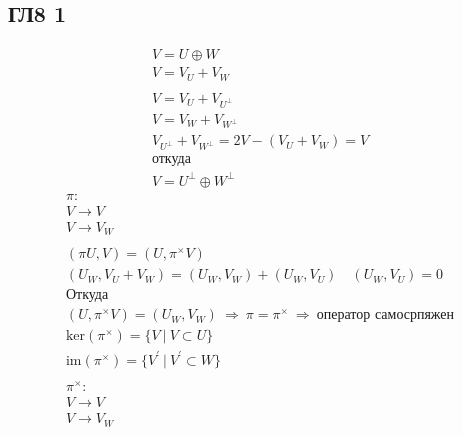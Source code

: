 \subsection*{ГЛ8 1}
\begin{gather*}
	V = U \oplus W\\
	V = V_{U} + V_{W}\\
	\\
	V = V_{U} + V_{U^{\perp}}\\
	V = V_{W} + V_{W^{\perp}}\\
	V_{U^{\perp}} + V_{W^{\perp}} = 2V - (V_{U} + V_{W}) = V\\
	\text{откуда}\\
	V = U^{\perp} \oplus W^{\perp}
\end{gather*}
\begin{gather*}
	\pi:\\
	V \to V\\
	V \to V_{W}\\
	\\
	(\pi U, V) = (U, \pi^{\times} V)\\
	(U_{W}, V_{U} + V_{W}) = (U_{W}, V_{W}) + (U_{W}, V_{U})\quad (U_{W}, V_{U}) = 0\\
	\text{Откуда}\\
	(U, \pi^{\times} V) = (U_{W}, V_{W})\ \Rightarrow\ \pi = \pi^{\times}\ \Rightarrow\ \text{оператор самосрпяжен}\\
	\text{ker}(\pi^{\times}) = \{V\ |\ V \subset U\}\\
	\text{im}(\pi^{\times}) = \{V^{\prime}\ |\ V^{\prime} \subset W\}\\
	\\
	\pi^{\times}:\\
	V \to V\\
	V \to V_{W}
\end{gather*}
		